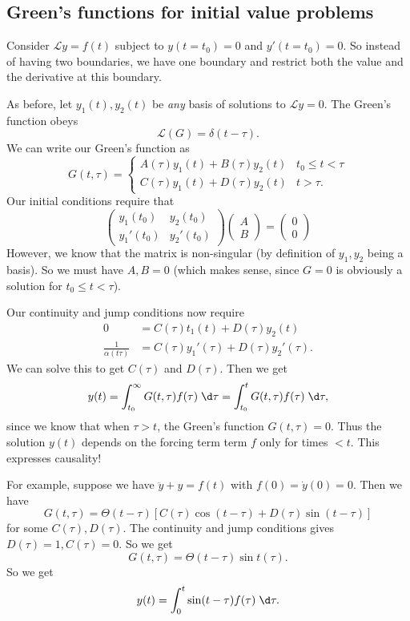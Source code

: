 \documentclass[a4paper]{article}
\begin{document}
\subsection{Green's functions for initial value problems}
Consider $\mathcal{L}y = f(t)$ subject to $y(t = t_0) = 0$ and $y'(t = t_0) = 0$. So instead of having two boundaries, we have one boundary and restrict both the value and the derivative at this boundary.

As before, let $y_1(t), y_2(t)$ be \emph{any} basis of solutions to $\mathcal{L} y = 0$. The Green's function obeys
\[
  \mathcal{L}(G) = \delta(t - \tau).
\]
We can write our Green's function as
\[
  G(t, \tau) =
  \begin{cases}
    A(\tau) y_1(t) + B(\tau) y_2(t) & t_0 \leq t < \tau\\
    C(\tau) y_1(t) + D(\tau) y_2(t) & t > \tau.
  \end{cases}
\]
Our initial conditions require that
\[
  \begin{pmatrix}
    y_1(t_0) & y_2(t_0)\\
    y_1'(t_0) & y_2'(t_0)
  \end{pmatrix}
  \begin{pmatrix}
    A\\
    B
  \end{pmatrix}
  =
  \begin{pmatrix}
    0\\0
  \end{pmatrix}
\]
However, we know that the matrix is non-singular (by definition of $y_1, y_2$ being a basis). So we must have $A, B = 0$ (which makes sense, since $G = 0$ is obviously a solution for $t_0 \leq t < \tau$).

Our continuity and jump conditions now require
\begin{align*}
  0 &= C(\tau) t_1(t) + D(\tau) y_2(t)\\
  \frac{1}{\alpha(t\tau)} &= C(\tau) y_1'(\tau)  + D(\tau) y_2'(\tau).
\end{align*}
We can solve this to get $C(\tau)$ and $D(\tau)$. Then we get
\[
  y(t) = \int_{t_0}^\infty G(t, \tau) f(\tau)\;\d \tau = \int_{t_0}^t G(t, \tau) f(\tau) \;\d \tau,
\]
since we know that when $\tau > t$, the Green's function $G(t, \tau) = 0$. Thus the solution $y(t)$ depends on the forcing term term $f$ only for times $ < t$. This expresses causality!

\begin{eg}
  For example, suppose we have $\ddot{y} + y = f(t)$ with $f(0) = \dot{y}(0) = 0$. Then we have
  \[
    G(t, \tau) = \Theta(t - \tau) [C(\tau) \cos(t - \tau) + D(\tau) \sin (t - \tau)]
  \]
  for some $C(\tau), D(\tau)$. The continuity and jump conditions gives $D(\tau) = 1, C(\tau) = 0$. So we get
  \[
    G(t, \tau) = \Theta(t - \tau) \sin t(\tau).
  \]
  So we get
  \[
    y(t) = \int_0^t \sin (t - \tau) f(\tau) \;\d \tau.
  \]
\end{eg}
\end{document}
